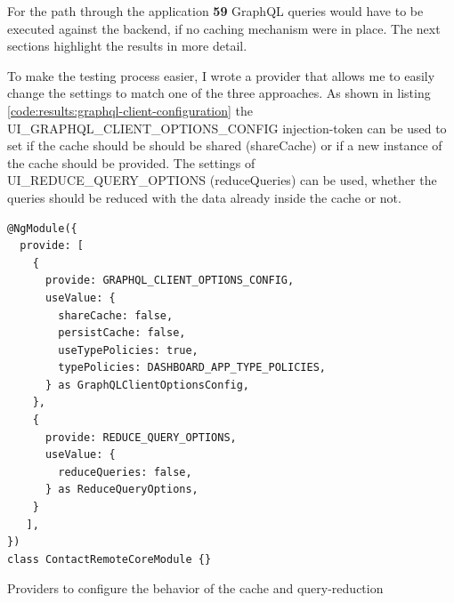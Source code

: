 For the path through the application \textbf{59} GraphQL queries would have to be executed against the backend, if no caching mechanism were in place. The next sections highlight the results in more detail.

To make the testing process easier, I wrote a provider that allows me to easily change the settings to match one of the three approaches. As shown in listing \ref{code:results:graphql-client-configuration} the UI\_GRAPHQL\_CLIENT\_OPTIONS\_CONFIG injection-token can be used to set if the cache should be should be shared (shareCache) or if a new instance of the cache should be provided. The settings of UI\_REDUCE\_QUERY\_OPTIONS (reduceQueries) can be used, whether the queries should be reduced with the data already inside the cache or not.

\ifshowListings
\begin{listing}[H]
\begin{verbatim}
@NgModule({
  provide: [
    {
      provide: GRAPHQL_CLIENT_OPTIONS_CONFIG,  
      useValue: {  
        shareCache: false,  
        persistCache: false,  
        useTypePolicies: true,  
        typePolicies: DASHBOARD_APP_TYPE_POLICIES,  
      } as GraphQLClientOptionsConfig,  
    },  
    {  
      provide: REDUCE_QUERY_OPTIONS,  
      useValue: {  
        reduceQueries: false,  
      } as ReduceQueryOptions,  
    }
   ],
})
class ContactRemoteCoreModule {}
\end{verbatim}
\caption{Providers to configure the behavior of the cache and query-reduction}\label{code:results:graphql-client-configuration}
\end{listing}
\fi

